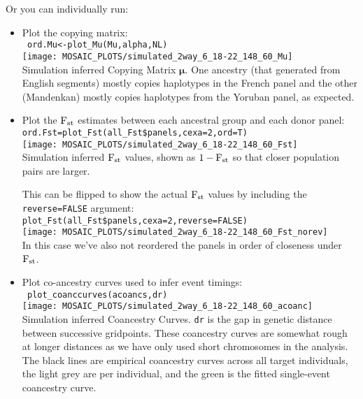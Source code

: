 \documentclass{article}
\begin{document}
Or you can individually run:
\begin{itemize}
  \item Plot the copying matrix:\\
\verb+ ord.Mu<-plot_Mu(Mu,alpha,NL) +\\
    \texttt{[image: MOSAIC\_PLOTS/simulated\_2way\_6\_18-22\_148\_60\_Mu]}\\
    Simulation inferred Copying Matrix $\bm\mu$. One ancestry (that generated from English segments)
    mostly copies haplotypes in the French panel and the other (Mandenkan) mostly copies haplotypes
    from the Yoruban panel, as expected. 
    
  \item Plot the $\textrm{F}_{\textrm{st}}$ estimates between each ancestral group and each donor panel:\\
    \verb+ord.Fst=plot_Fst(all_Fst$panels,cexa=2,ord=T)+\\
    \texttt{[image: MOSAIC\_PLOTS/simulated\_2way\_6\_18-22\_148\_60\_Fst]}\\
    Simulation inferred $\textrm{F}_{\textrm{st}}$ values, shown as $1-\textrm{F}_{\textrm{st}}$ so that closer population pairs are larger. 
    
    This can be flipped to show the
    actual $\textrm{F}_{\textrm{st}}$ values by including the \texttt{reverse=FALSE} argument:\\
    \verb+plot_Fst(all_Fst$panels,cexa=2,reverse=FALSE)+\\
    \texttt{[image: MOSAIC\_PLOTS/simulated\_2way\_6\_18-22\_148\_60\_Fst\_norev]}\\
    In this case we've also not reordered the panels in order of closeness under $\textrm{F}_{\textrm{st}}$. 

\item Plot co-ancestry curves used to infer event timings:\\
\verb+ plot_coanccurves(acoancs,dr)+\\
    \texttt{[image: MOSAIC\_PLOTS/simulated\_2way\_6\_18-22\_148\_60\_acoanc]}\\
    Simulation inferred Coancestry Curves. \texttt{dr} is the gap in genetic distance between successive gridpoints. 
    These coancestry curves are somewhat rough at longer distances as we have only used short chromosomes in the analysis. 
    The black lines are empirical coancestry curves across all target individuals, the light grey are per individual, and the green is
    the fitted single-event coancestry curve. 



\end{itemize}
\end{document}
